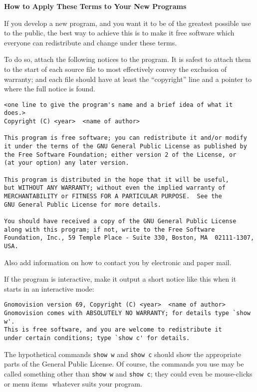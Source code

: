 {\footnotesize
{\medskip\noindent\normalsize\textbf{How to Apply These Terms to Your New Programs}\smallskip}

If you develop a new program, and you want it to be of the greatest
possible use to the public, the best way to achieve this is to make it
free software which everyone can redistribute and change under these
terms.

To do so, attach the following notices to the program.  It is safest to
attach them to the start of each source file to most effectively convey
the exclusion of warranty; and each file should have at least the
``copyright'' line and a pointer to where the full notice is found.

\begin{verbatim}
<one line to give the program's name and a brief idea of what it does.>
Copyright (C) <year>  <name of author>

This program is free software; you can redistribute it and/or modify
it under the terms of the GNU General Public License as published by
the Free Software Foundation; either version 2 of the License, or
(at your option) any later version.

This program is distributed in the hope that it will be useful,
but WITHOUT ANY WARRANTY; without even the implied warranty of
MERCHANTABILITY or FITNESS FOR A PARTICULAR PURPOSE.  See the
GNU General Public License for more details.

You should have received a copy of the GNU General Public License
along with this program; if not, write to the Free Software
Foundation, Inc., 59 Temple Place - Suite 330, Boston, MA  02111-1307,
USA.
\end{verbatim}

Also add information on how to contact you by electronic and paper mail.

If the program is interactive, make it output a short notice like this
when it starts in an interactive mode:

\begin{verbatim}
Gnomovision version 69, Copyright (C) <year>  <name of author>
Gnomovision comes with ABSOLUTELY NO WARRANTY; for details type `show w'.
This is free software, and you are welcome to redistribute it
under certain conditions; type `show c' for details.
\end{verbatim}


The hypothetical commands {\tt show w} and {\tt show c} should show the
appropriate parts of the General Public License.  Of course, the commands
you use may be called something other than {\tt show w} and {\tt show c};
they could even be mouse-clicks or menu items\,\textemdash\ whatever suits your
program.

}
